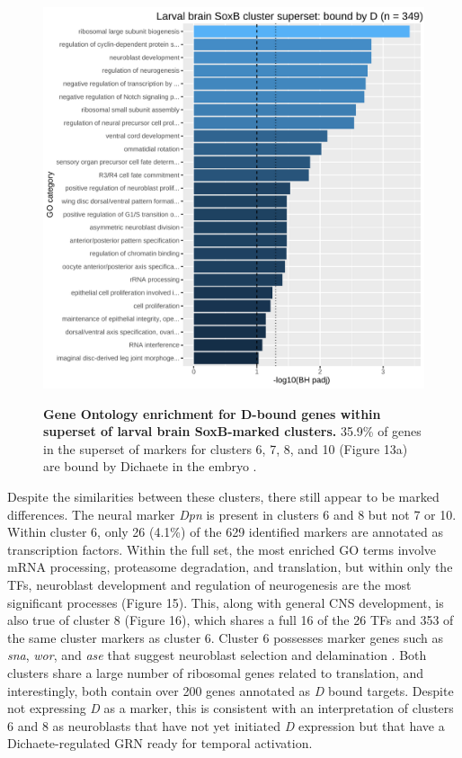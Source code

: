 \documentclass[withindex,glossary]{cam-thesis}
\begin{document}
\setcounter{figure}{18-1}
\begin{figure}[htbp]
\centering
\includegraphics[width=\dimexpr\textwidth\relax,keepaspectratio]{figs/Fig18 avalos Combined_clusterSuperset_DBind.pdf}
\label{fig18}
\caption{\textbf{Gene Ontology enrichment for D-bound genes within superset of larval brain SoxB-marked clusters.} 35.9\% of genes in the superset of markers for clusters 6, 7, 8, and 10 (Figure 13a) are bound by Dichaete in the embryo \protect{}.}
\end{figure}

Despite the similarities between these clusters, there still appear to
be marked differences. The neural marker \emph{Dpn} is present in
clusters 6 and 8 but not 7 or 10. Within cluster 6, only 26 (4.1\%) of
the 629 identified markers are annotated as transcription factors.
Within the full set, the most enriched GO terms involve mRNA processing,
proteasome degradation, and translation, but within only the TFs,
neuroblast development and regulation of neurogenesis are the most
significant processes (Figure 15). This, along with general CNS
development, is also true of cluster 8 (Figure 16), which shares a full
16 of the 26 TFs and 353 of the same cluster markers as cluster 6.
Cluster 6 possesses marker genes such as \emph{sna}, \emph{wor}, and
\emph{ase} that suggest neuroblast selection and delamination . Both clusters share a large number of ribosomal genes
related to translation, and interestingly, both contain over 200 genes
annotated as \emph{D} bound targets. Despite not expressing \emph{D} as
a marker, this is consistent with an interpretation of clusters 6 and 8
as neuroblasts that have not yet initiated \emph{D} expression but that
have a Dichaete-regulated GRN ready for temporal activation.
\end{document}
